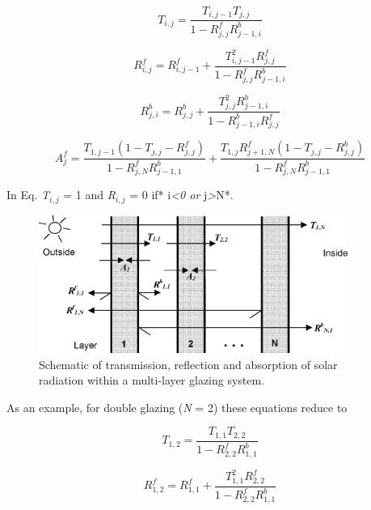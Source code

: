 \begin{equation}
{T_{i,j}} = \frac{{{T_{i,j - 1}}{T_{j,j}}}}{{1 - R_{j,j}^fR_{j - 1,i}^b}}
\end{equation}

\begin{equation}
R_{i,j}^f = R_{i,j - 1}^f + \frac{{T_{i,j - 1}^2R_{j,j}^f}}{{1 - R_{j,j}^fR_{j - 1,i}^b}}
\end{equation}

\begin{equation}
R_{j,i}^b = R_{j,j}^b + \frac{{T_{j,j}^2R_{j - 1,i}^b}}{{1 - R_{j - 1,i}^bR_{j,j}^f}}
\end{equation}

\begin{equation}
A_j^f = \frac{{{T_{1,j - 1}}(1 - {T_{j,j}} - R_{j,j}^f)}}{{1 - R_{j,N}^fR_{j - 1,1}^b}} + \frac{{{T_{1,j}}R_{j + 1,N}^f(1 - {T_{j,j}} - R_{j,j}^b)}}{{1 - R_{j,N}^fR_{j - 1,1}^b}}
\end{equation}

In Eq. \emph{T\(_{i,j}\)} = 1 and \emph{R\(_{i,j}\)} = 0 if* i\emph{\textless{}0 or} j\emph{\textgreater{}}N*.

\begin{figure}[hbtp] %
\centering
\includegraphics[width=0.9\textwidth, height=0.9\textheight, keepaspectratio=true]{media/image956.png}
\caption{Schematic of transmission, reflection and absorption of solar radiation within a multi-layer glazing system. \protect \label{fig:schematic-of-transmission-reflection}}
\end{figure}

As an example, for double glazing (\emph{N} = 2) these equations reduce to

\begin{equation}
{T_{1,2}} = \frac{{{T_{1,1}}{T_{2,2}}}}{{1 - R_{2,2}^fR_{1,1}^b}}
\end{equation}

\begin{equation}
R_{1,2}^f = R_{1,1}^f + \frac{{T_{1,1}^2R_{2,2}^f}}{{1 - R_{2,2}^fR_{1,1}^b}}
\end{equation}

